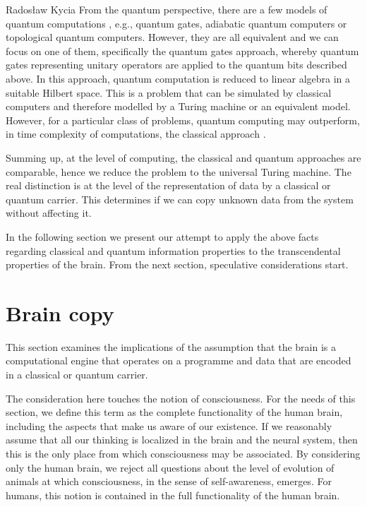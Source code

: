 \begin{artengenv}{Radosław Kycia}
From the quantum perspective, there are a few models of quantum computations \parencite{QuantumComputing}, e.g., quantum gates, adiabatic quantum computers or topological quantum computers. However, they are all equivalent and we can focus on one of them, specifically the quantum gates approach, whereby quantum gates representing unitary operators are applied to the quantum bits described above. In this approach, quantum computation is reduced to linear algebra in a suitable Hilbert space. This is a problem that can be simulated by classical computers and therefore modelled by a Turing machine or an equivalent model. However, for a particular class of problems, quantum computing may outperform, in time complexity of computations, the classical approach \parencite{QuantumComputing}.  

Summing up, at the level of computing, the classical and quantum approaches are comparable, hence we reduce the problem to the universal Turing machine. The real distinction is at the level of the representation of data by a classical or quantum carrier. This determines if we can copy unknown data from the system without affecting it.


In the following section we present our attempt to apply the above facts regarding classical and quantum information properties to the transcendental properties of the brain. From the next section, speculative considerations start.



\section{Brain copy}
This section examines the implications of the assumption that the brain is a computational engine that operates on a programme and data that are encoded in a classical or quantum carrier.


The consideration here touches the notion of consciousness. For the needs of this section, we define this term as the complete functionality of the human brain, including the aspects that make us aware of our existence. If we reasonably assume that all our thinking is localized in the brain and the neural system, then this is the only place from which consciousness may be associated. By considering only the human brain, we reject all questions about the level of evolution of animals at which consciousness, in the sense of self-awareness, emerges. For humans, this notion is contained in the full functionality of the human brain.


\end{artengenv}
